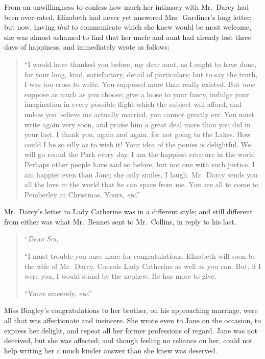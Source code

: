 \documentclass[12pt,english]{book}
\newcommand{\noun}[1]{\textsc{#1}}
\begin{document}
From an unwillingness to confess how much her intimacy with Mr.\ Darcy
had been over-rated, Elizabeth had never yet answered Mrs.\ Gardiner's
long letter; but now, having \textit{that} to communicate which she
knew would be most welcome, she was almost ashamed to find that her
uncle and aunt had already lost three days of happiness, and immediately
wrote as follows:

\begin{quotation}
{}``I would have thanked you before, my dear aunt, as I ought to
have done, for your long, kind, satisfactory, detail of particulars;
but to say the truth, I was too cross to write. You supposed more
than really existed. But \textit{now} suppose as much as you choose;
give a loose to your fancy, indulge your imagination in every possible
flight which the subject will afford, and unless you believe me actually
married, you cannot greatly err. You must write again very soon, and
praise him a great deal more than you did in your last. I thank you,
again and again, for not going to the Lakes. How could I be so silly
as to wish it! Your idea of the ponies is delightful. We will go round
the Park every day. I am the happiest creature in the world. Perhaps
other people have said so before, but not one with such justice. I
am happier even than Jane; she only smiles, I laugh. Mr.\ Darcy sends
you all the love in the world that he can spare from me. You are all
to come to Pemberley at Christmas. Yours, \textit{etc}.'' 
\end{quotation}
Mr.\ Darcy's letter to Lady Catherine was in a different style; and
still different from either was what Mr.\ Bennet sent to Mr.\ Collins,
in reply to his last.

\begin{quotation}
\noindent {}``\textit{\emph{\noun{Dear}}} \textit{\emph{\noun{Sir}}},\nopagebreak[4]

{}``I must trouble you once more for congratulations. Elizabeth will
soon be the wife of Mr.\ Darcy. Console Lady Catherine as well as
you can. But, if I were you, I would stand by the nephew. He has more
to give.

``Yours sincerely, \textit{etc}.'' 
\end{quotation}
Miss Bingley's congratulations to her brother, on his approaching
marriage, were all that was affectionate and insincere. She wrote
even to Jane on the occasion, to express her delight, and repeat all
her former professions of regard. Jane was not deceived, but she was
affected; and though feeling no reliance on her, could not help writing
her a much kinder answer than she knew was deserved.
\end{document}
